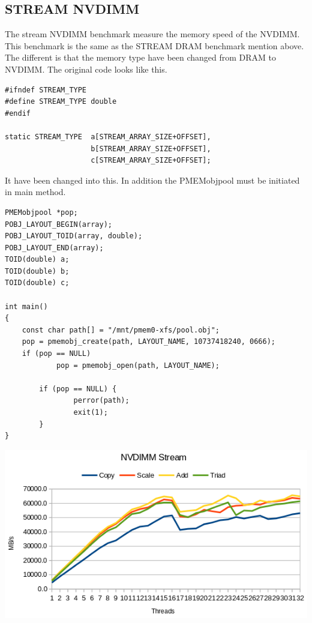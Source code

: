 \documentclass[12pt,a4paper,USenglish]{article}      %
\begin{document}
\subsection{STREAM NVDIMM}
The stream NVDIMM benchmark measure the memory speed of the NVDIMM. This benchmark is the same as the STREAM DRAM benchmark mention above. The different is that the memory type have been changed from DRAM to NVDIMM.
The original code looks like this.
\begin{lstlisting}[caption=Description]
#ifndef STREAM_TYPE
#define STREAM_TYPE double
#endif

static STREAM_TYPE  a[STREAM_ARRAY_SIZE+OFFSET],
                    b[STREAM_ARRAY_SIZE+OFFSET],
                    c[STREAM_ARRAY_SIZE+OFFSET];
\end{lstlisting}
It have been changed into this. In addition the PMEMobjpool must be initiated in main method.
\begin{lstlisting}
PMEMobjpool *pop;
POBJ_LAYOUT_BEGIN(array);
POBJ_LAYOUT_TOID(array, double);
POBJ_LAYOUT_END(array);
TOID(double) a;
TOID(double) b;
TOID(double) c;

int main()
{
	const char path[] = "/mnt/pmem0-xfs/pool.obj";
	pop = pmemobj_create(path, LAYOUT_NAME, 10737418240, 0666);
	if (pop == NULL)
        	pop = pmemobj_open(path, LAYOUT_NAME);

        if (pop == NULL) {
                perror(path);
                exit(1);
        }
}

\end{lstlisting}

\includegraphics[scale=0.7]{NVDIMM_stream2.png}
\end{document}

